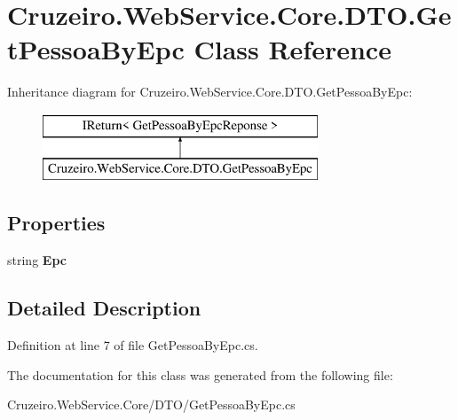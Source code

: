 \hypertarget{class_cruzeiro_1_1_web_service_1_1_core_1_1_d_t_o_1_1_get_pessoa_by_epc}{}\section{Cruzeiro.\+Web\+Service.\+Core.\+D\+T\+O.\+Get\+Pessoa\+By\+Epc Class Reference}
\label{class_cruzeiro_1_1_web_service_1_1_core_1_1_d_t_o_1_1_get_pessoa_by_epc}
Inheritance diagram for Cruzeiro.\+Web\+Service.\+Core.\+D\+T\+O.\+Get\+Pessoa\+By\+Epc\+:\begin{figure}[H]
\begin{center}
\leavevmode
\includegraphics[height=2.000000cm]{class_cruzeiro_1_1_web_service_1_1_core_1_1_d_t_o_1_1_get_pessoa_by_epc}
\end{center}
\end{figure}
\subsection*{Properties}
\begin{DoxyCompactItemize}
\item 
string {\bfseries Epc}\hypertarget{class_cruzeiro_1_1_web_service_1_1_core_1_1_d_t_o_1_1_get_pessoa_by_epc_a1e9cc64e07da8f6543802ff8934771b8}{}\label{class_cruzeiro_1_1_web_service_1_1_core_1_1_d_t_o_1_1_get_pessoa_by_epc_a1e9cc64e07da8f6543802ff8934771b8}

\end{DoxyCompactItemize}


\subsection{Detailed Description}


Definition at line 7 of file Get\+Pessoa\+By\+Epc.\+cs.



The documentation for this class was generated from the following file\+:\begin{DoxyCompactItemize}
\item 
Cruzeiro.\+Web\+Service.\+Core/\+D\+T\+O/Get\+Pessoa\+By\+Epc.\+cs\end{DoxyCompactItemize}
